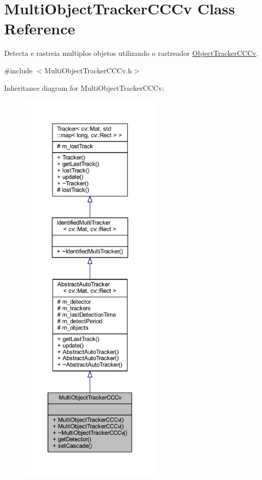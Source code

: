 \hypertarget{class_viscv_1_1_multi_object_tracker_c_c_cv}{}\section{Multi\+Object\+Tracker\+C\+C\+Cv Class Reference}
\label{class_viscv_1_1_multi_object_tracker_c_c_cv}


Detecta e rastreia multiplos objetos utilizando o rastreador \textquotesingle{}\hyperlink{class_viscv_1_1_object_tracker_c_c_cv}{Object\+Tracker\+C\+C\+Cv}\textquotesingle{}.  




{\ttfamily \#include $<$Multi\+Object\+Tracker\+C\+C\+Cv.\+h$>$}



Inheritance diagram for Multi\+Object\+Tracker\+C\+C\+Cv\+:
\nopagebreak
\begin{figure}[H]
\begin{center}
\leavevmode
\includegraphics[height=550pt]{class_viscv_1_1_multi_object_tracker_c_c_cv__inherit__graph}
\end{center}
\end{figure}


